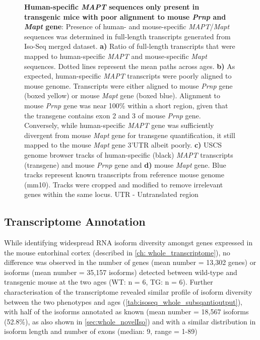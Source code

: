 \begin{figure}[htp]
	{\textbf{Human-specific \textit{MAPT} sequences only present in transgenic mice with poor alignment to mouse \textit{Prnp} and \textit{Mapt} gene}: Presence of human- and mouse-specific \textit{MAPT}/\textit{Mapt} sequences was determined in full-length transcripts generated from Iso-Seq merged dataset. \textbf{a)} Ratio of full-length transcripts that were mapped to human-specific \textit{MAPT} and mouse-specific \textit{Mapt} sequences. Dotted lines represent the mean paths across ages. \textbf{b)} As expected, human-specific \textit{MAPT} transcripts were poorly aligned to mouse genome. Transcripts were either aligned to mouse \textit{Prnp} gene (boxed yellow) or  mouse \textit{Mapt} gene (boxed blue). Alignment to mouse \textit{Prnp} gene was near 100\% within a short region, given that the transgene contains exon 2 and 3 of mouse \textit{Prnp} gene\cite{Ramsden2005}. Conversely, while human-specific \textit{MAPT} gene was sufficiently divergent from mouse \textit{Mapt} gene for transgene quantification, it still mapped to the mouse \textit{Mapt} gene 3'UTR albeit poorly. \textbf{c)} USCS genome browser tracks of human-specific (black) \textit{MAPT} transcripts (transgene) and mouse \textit{Prnp} gene and \textbf{d)} mouse \textit{Mapt} gene. Blue tracks represent known transcripts from reference mouse genome (mm10). Tracks were cropped and modified to remove irrelevant genes within the same locus.  UTR - Untranslated region}
	\label{fig:isoseq_humanmapt}
\end{figure}


\subsection{Transcriptome Annotation}
While identifying widespread RNA isoform diversity amongst genes expressed in the mouse entorhinal cortex (described in \cref{ch: whole_transcriptome}), no difference was observed in the number of genes (mean number = 13,302 genes) or isoforms (mean number = 35,157 isoforms) detected between wild-type and transgenic mouse at the two ages (WT: n = 6, TG: n = 6). Further characterisation of the transcriptome revealed similar profile of isoform diversity between the two phenotypes and ages (\cref{tab:isoseq_whole_subsqantioutput}), with half of the isoforms annotated as known (mean number = 18,567 isoforms (52.8\%), as also shown in \cref{sec:whole_novelIso}) and with a similar distribution in isoform length and number of exons (median: 9, range = 1-89) 

